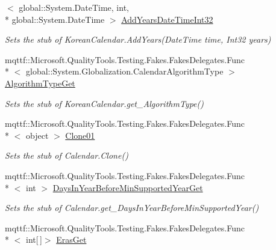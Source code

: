 \begin{DoxyCompactItemize}
$<$ global\-::\-System.\-Date\-Time, int, \\*
global\-::\-System.\-Date\-Time $>$ \hyperlink{class_system_1_1_globalization_1_1_fakes_1_1_stub_korean_calendar_a32e85b4056586dfd8fbccdaa698d970c}{Add\-Years\-Date\-Time\-Int32}
\begin{DoxyCompactList}\small\item\em Sets the stub of Korean\-Calendar.\-Add\-Years(\-Date\-Time time, Int32 years)\end{DoxyCompactList}\item 
mqttf\-::\-Microsoft.\-Quality\-Tools.\-Testing.\-Fakes.\-Fakes\-Delegates.\-Func\\*
$<$ global\-::\-System.\-Globalization.\-Calendar\-Algorithm\-Type $>$ \hyperlink{class_system_1_1_globalization_1_1_fakes_1_1_stub_korean_calendar_a870400badf5d956d6b2d2ab63423d3ce}{Algorithm\-Type\-Get}
\begin{DoxyCompactList}\small\item\em Sets the stub of Korean\-Calendar.\-get\-\_\-\-Algorithm\-Type()\end{DoxyCompactList}\item 
mqttf\-::\-Microsoft.\-Quality\-Tools.\-Testing.\-Fakes.\-Fakes\-Delegates.\-Func\\*
$<$ object $>$ \hyperlink{class_system_1_1_globalization_1_1_fakes_1_1_stub_korean_calendar_a6f9e65fe1c890d7d81ea4fb81b5dcfcf}{Clone01}
\begin{DoxyCompactList}\small\item\em Sets the stub of Calendar.\-Clone()\end{DoxyCompactList}\item 
mqttf\-::\-Microsoft.\-Quality\-Tools.\-Testing.\-Fakes.\-Fakes\-Delegates.\-Func\\*
$<$ int $>$ \hyperlink{class_system_1_1_globalization_1_1_fakes_1_1_stub_korean_calendar_acfc9b3e9fad5230006306a0656bef514}{Days\-In\-Year\-Before\-Min\-Supported\-Year\-Get}
\begin{DoxyCompactList}\small\item\em Sets the stub of Calendar.\-get\-\_\-\-Days\-In\-Year\-Before\-Min\-Supported\-Year()\end{DoxyCompactList}\item 
mqttf\-::\-Microsoft.\-Quality\-Tools.\-Testing.\-Fakes.\-Fakes\-Delegates.\-Func\\*
$<$ int\mbox{[}$\,$\mbox{]}$>$ \hyperlink{class_system_1_1_globalization_1_1_fakes_1_1_stub_korean_calendar_a1c9eb69dd319eddb88a1e0d383b5ea52}{Eras\-Get}

\end{DoxyCompactItemize}

